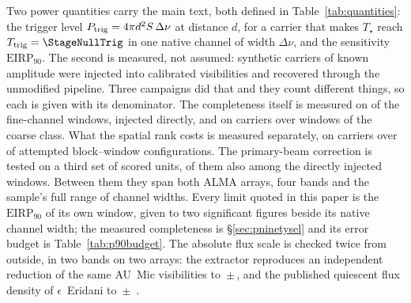 Two power quantities carry the main text, both defined in
Table~\ref{tab:quantities}: the trigger level $P_{\rm trig} = 4\pi
d^{2}S\,\Delta\nu$ at distance $d$, for a carrier that makes $T_\star$ reach
$T_{\rm trig}=\StageNullTrig$ in one native channel of width $\Delta\nu$,
and the sensitivity $\mathrm{EIRP}_{90}$. The second is measured, not
assumed: synthetic carriers of known amplitude were injected into
calibrated visibilities and recovered through the unmodified pipeline.
Three campaigns did that and they count different things, so each is given
with its denominator. The completeness itself is measured on
\MkInjCompWin{} of the \MkInjCompDenom{} fine-channel windows, injected
directly, and on \SensNToneCoarse{} carriers over \SensNInjCoarse{} windows
of the coarse class. What the spatial rank costs is measured separately, on
\SelNTone{} carriers over \MkInjSelUnit{} of \MkInjSelTotal{} attempted
block--window configurations. The primary-beam correction is tested on a
third set of \MkInjBeamUnit{} scored units, \MkInjBeamShared{} of them also
among the directly injected windows. Between them they span both ALMA
arrays, four bands and the sample's full range of
channel widths. Every limit quoted in
this paper is the $\mathrm{EIRP}_{90}$ of its own window, given to two
significant figures beside its native channel width; the measured
completeness is \S\ref{sec:pninetysel} and its error
budget is Table~\ref{tab:p90budget}. The absolute flux scale is checked twice from
outside, in two bands on two arrays: the extractor reproduces an
independent reduction of the same AU~Mic visibilities to
\PxJanRatio\,$\pm$\,\PxJanRatioErr, and the published quiescent flux
density of $\epsilon$~Eridani to \PxEpsRatio\,$\pm$\,\PxEpsRatioErr{}
\citep{Burton2022}.

